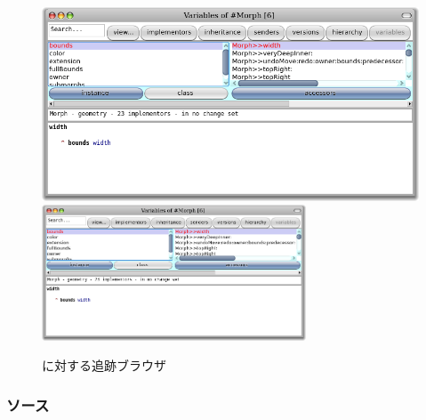 \documentclass[a4paper,10pt,twoside]{book}
\begin{document}
\begin{figure}[btp]
\begin{center}
\ifluluelse
{\includegraphics[width=\textwidth]{chasingBrowser}}
{\includegraphics[width=0.7\textwidth]{chasingBrowser}}
\end{center}
\caption{に対する追跡ブラウザ}
\end{figure}



\subsubsection{ソース}
\end{document}
